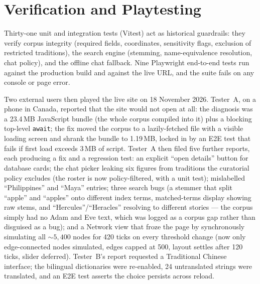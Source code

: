 \documentclass[12pt,a4paper]{article}
\renewcommand{\footnotesize}{\fontsize{10}{12}\selectfont}
\begin{document}
\begin{table}[htbp]
  \centering
  \footnotesize
  \singlespacing
  \renewcommand{\arraystretch}{1.25}
  
  \caption{Claims and design elements with locators, evidence tiers
  (\emph{据} documented, \emph{推断} inferred, \emph{设} invented), and limits.}
  \label{tab:evidence}
\end{table}

\section{Verification and Playtesting}

Thirty-one unit and integration tests (Vitest) act as historical guardrails:
they verify corpus integrity (required fields, coordinates, sensitivity
flags, exclusion of restricted traditions), the search engine (stemming,
name-equivalence resolution, chat policy), and the offline chat fallback.
Nine Playwright end-to-end tests run against the production build and
against the live URL, and the suite fails on any console or page error.

Two external users then played the live site on 18 November 2026. Tester~A,
on a phone in Canada, reported that the site would not open at all: the
diagnosis was a 23.4\,MB JavaScript bundle (the whole corpus compiled into
it) plus a blocking top-level \texttt{await}; the fix moved the corpus to a
lazily-fetched file with a visible loading screen and shrank the bundle to
1.19\,MB, locked in by an E2E test that fails if first load exceeds 3\,MB of
script. Tester~A then filed five further reports, each producing a fix and
a regression test: an explicit ``open details'' button for database cards;
the chat picker leaking six figures from traditions the curatorial policy
excludes (the roster is now policy-filtered, with a unit test); mislabelled
``Philippines'' and ``Maya'' entries; three search bugs (a stemmer that
split ``apple'' and ``apples'' onto different index terms, matched-terms
display showing raw stems, and ``Hercules''/``Heracles'' resolving to
different stories --- the corpus simply had no Adam and Eve text, which was
logged as a corpus gap rather than disguised as a bug); and a Network view
that froze the page by synchronously simulating all ${\sim}5{,}400$ nodes
for 420 ticks on every threshold change (now only edge-connected nodes
simulated, edges capped at 500, layout settles after 120 ticks, slider
deferred). Tester~B's report requested a Traditional Chinese interface; the
bilingual dictionaries were re-enabled, 24 untranslated strings were
translated, and an E2E test asserts the choice persists across reload.
\end{document}

